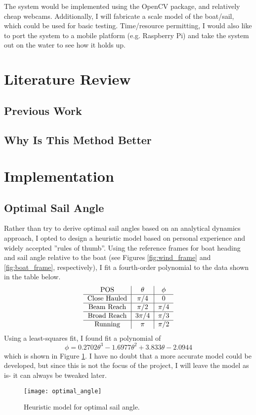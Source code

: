 \documentclass[letterpaper, 10 pt, conference]{ieeeconf}  %
\begin{document}
The system would be implemented using the OpenCV package, and relatively cheap webcams. Additionally, I will fabricate a scale model of the boat/sail, which could be used for basic testing. Time/resource permitting, I would also like to port the system to a mobile platform (e.g. Raspberry Pi) and take the system out on the water to see how it holds up.

\section{Literature Review}
\subsection{Previous Work}
\subsection{Why Is This Method Better}
\section{Implementation}
\subsection{Optimal Sail Angle}
Rather than try to derive optimal sail angles based on an analytical dynamics approach, I opted to design a heuristic model based on personal experience and widely accepted ''rules of thumb''. Using the reference frames for boat heading and sail angle relative to the boat (see Figures \ref{fig:wind_frame} and \ref{fig:boat_frame}, respectively), I fit a fourth-order polynomial to the data shown in the table below.
\[
\begin{tabular}{c|c|c}
POS & $\theta$ & $\phi$ \\\hline 
Close Hauled & $\pi/4$ & 0 \\\hline 
Beam Reach & $\pi/2$ & $\pi/4$ \\\hline 
Broad Reach & $3\pi/4$ & $\pi/3$\\\hline 
Running & $\pi$ & $\pi/2$\end{tabular}
\]
Using a least-squares fit, I found fit a polynomial of 
\[
\phi = 0.2702 \theta^3 -1.6977 \theta^2 + 3.833 \theta  -2.0944 
\]
which is shown in Figure \ref{fig:optimal}. I have no doubt that a more accurate model could be developed, but since this is not the focus of the project, I will leave the model as is- it can always be tweaked later. 
\begin{figure}[htbp]
   \centering
   \texttt{[image: optimal\_angle]} %
   \caption{Heuristic model for optimal sail angle.}
   \label{fig:optimal}
\end{figure}
\end{document}
